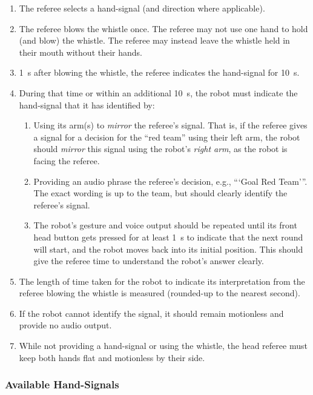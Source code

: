 \begin{enumerate}
    \item The referee selects a hand-signal (and direction where applicable).
    \item The referee blows the whistle once. The referee may not use one hand to hold (and blow) the whistle. The referee may instead leave the whistle held in their mouth without their hands.
    \item \qty{1}{\second} after blowing the whistle, the referee indicates the hand-signal for \qty{10}{\second}.
    \item During that time or within an additional \qty{10}{\second}, the robot must indicate the hand-signal that it has identified by:
    \begin{enumerate}
        \item Using its arm(s) to \emph{mirror} the referee's signal. That is, if the referee gives a signal for a decision for the ``red team'' using their left arm, the robot should \emph{mirror} this signal using the robot's \emph{right arm}, as the robot is facing the referee.
        \item Providing an audio phrase the referee's decision, e.g., ```Goal Red Team'''.  The exact wording is up to the team, but should clearly identify the referee's signal.
        \item The robot's gesture and voice output should be repeated until its front head button gets pressed for at least \qty{1}{\second} to indicate that the next round will start, and the robot moves back into its initial position. This should give the referee time to understand the robot's answer clearly.
    \end{enumerate}
    \item The length of time taken for the robot to indicate its interpretation from the referee blowing the whistle is measured (rounded-up to the nearest second).
    \item If the robot cannot identify the signal, it should remain motionless and provide no audio output.
    \item While not providing a hand-signal or using the whistle, the head referee must keep both hands flat and motionless by their side.
\end{enumerate}


\subsubsection{Available Hand-Signals}

